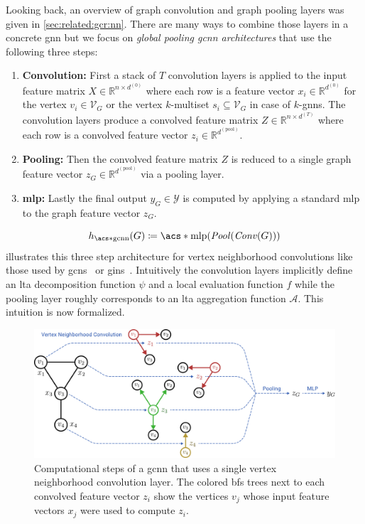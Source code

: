 Looking back, an overview of graph convolution and graph pooling layers was given in \cref{sec:related:gcr:nn}.
There are many ways to combine those layers in a concrete \ac{gnn} but we focus on \textit{global pooling \ac{gcnn} architectures} that use the following three steps:
\begin{enumerate}[label=\textbf{\arabic*.}]
	\item \textbf{Convolution:}
		First a stack of $T$ convolution layers is applied to the input feature matrix $X \in \mathbb{R}^{n \times d^{(0)}}$ where each row is a feature vector $x_i \in \mathbb{R}^{d^{(0)}}$ for the vertex $v_i \in \mathcal{V}_G$ or the vertex $k$-multiset $s_i \subseteq \mathcal{V}_G$ in case of $k$-\acsp{gnn}.
		The convolution layers produce a convolved feature matrix $Z \in \mathbb{R}^{n \times d^{(T)}}$ where each row is a convolved feature vector $z_i \in \mathbb{R}^{d^{(\mathrm{pool})}}$.
	\item \textbf{Pooling:}
		Then the convolved feature matrix $Z$ is reduced to a single graph feature vector $z_G \in \mathbb{R}^{d^{(\mathrm{pool})}}$ via a pooling layer.
	\item \textbf{\ac{mlp}:}
		Lastly the final output $y_G \in \mathcal{Y}$ is computed by applying a standard \ac{mlp} to the graph feature vector $z_G$.
\end{enumerate}
\[
	h_{\mathrm{\acs*{gcnn}}}(G) \coloneqq \mathrm{\acs*{mlp}}(\mathit{Pool}(\mathit{Conv}(G)))
\]
 illustrates this three step architecture for vertex neighborhood convolutions like those used by \acp{gcn}~\cite{Kipf2017} or \acp{gin}~\cite{Xu2018}.
Intuitively the convolution layers implicitly define an \ac{lta} decomposition function $\psi$ and a local evaluation function $f$ while the pooling layer roughly corresponds to an \ac{lta} aggregation function $\mathcal{A}$.
This intuition is now formalized.
\begin{figure}[ht]
	\centering
	\includegraphics[width=\linewidth]{gfx/graph-lta/gcnn-structure.pdf}
	\caption[Computational steps of a \ac{gcnn} that uses a single vertex neighborhood convolution layer.]{
		Computational steps of a \ac{gcnn} that uses a single vertex neighborhood convolution layer.
		The colored \ac{bfs} trees next to each convolved feature vector $z_i$ show the vertices $v_j$ whose input feature vectors $x_j$ were used to compute $z_i$.
	}\label{fig:ltag:gcnn-structure}
\end{figure}

